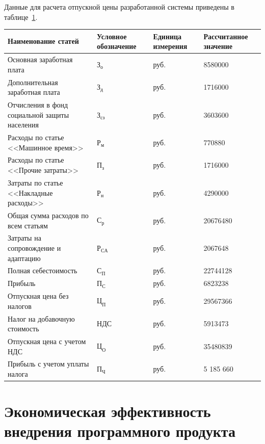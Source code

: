 \documentclass[14pt,a4paper]{reportmod}
\begin{document}
Данные для расчета отпускной цены разработанной системы приведены в таблице~\ref{table:expenses}.

\begin{table}[ht]
  \caption{Расчетные сметы затрат и отпускной цены}
  \small {
    \begin{longtable}{|p{5.5cm}|p{2cm}|p{3cm}|p{3cm}|}
      \hline
      \bfseries{Наименование статей} &
      \bfseries{Условное обозначение} &
      \bfseries{Единица измерения} &
      \bfseries{Рассчитанное значение} \\
      \hline
      Основная заработная плата & $З_{о}$ & руб. & 8580000 \\
      \hline
      Дополнительная заработная плата & $З_{д}$ & руб. & 1716000 \\
      \hline
      Отчисления в фонд социальной защиты населения & $З_{сз}$ & руб. & 3603600 \\
      \hline
      Расходы по статье <<Машинное время>> & $Р_{м}$ & руб. & 770880 \\
      \hline
      Расходы по статье <<Прочие затраты>> & $П_{з}$ & руб. & 1716000 \\
      \hline
      Затраты по статье <<Накладные расходы>> & $Р_{н}$ & руб. & 4290000 \\
      \hline
      Общая сумма расходов по всем статьям & $С_{р}$ & руб. & 20676480 \\
      \hline
      Затраты на сопровождение и адаптацию & $Р_{СА}$ & руб. & 2067648 \\
      \hline
      Полная себестоимость & $С_{П}$ & руб. & 22744128 \\
      \hline
      Прибыль & $П_{С}$ & руб. & 6823238 \\
      \hline
      Отпускная цена без налогов & $Ц_{П}$ & руб. & 29567366 \\
      \hline
      Налог на добавочную стоимость & $НДС$ & руб. & 5913473 \\
      \hline
      Отпускная цена с учетом НДС & $Ц_{О}$ & руб. & 35480839 \\
      \hline
      Прибыль с учетом уплаты налога & $П_{Ч}$ & руб. & 5 185 660 \\
      \hline
    \end{longtable}
  }
  \label{table:expenses}
\end{table}

\section{Экономическая эффективность внедрения программного продукта}
\end{document}
